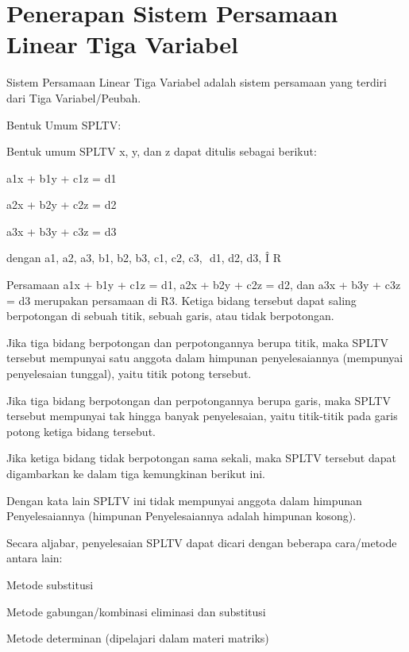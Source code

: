 \documentclass[11pt,fleqn]{book} %
\begin{document}
\section{Penerapan Sistem Persamaan Linear Tiga Variabel}
\sloppy
Sistem Persamaan Linear Tiga Variabel adalah sistem persamaan yang terdiri dari Tiga Variabel/Peubah. \par
\noindent 
Bentuk Umum SPLTV: \par
\noindent 
Bentuk umum SPLTV x, y, dan z dapat ditulis sebagai berikut: \par
\noindent 
a1x + b1y + c1z = d1 \par
\noindent 
a2x + b2y + c2z = d2 \par
\noindent 
a3x + b3y + c3z = d3 \par
\noindent 
dengan a1, a2, a3, b1, b2, b3, c1, c2, c3, $  $ $  $d1, d2, d3, $  $Î $  $R \par
\noindent 
Persamaan a1x + b1y + c1z = d1, a2x + b2y + c2z = d2, dan a3x + b3y + c3z = d3 merupakan persamaan di R3. Ketiga bidang tersebut dapat saling berpotongan di sebuah titik, sebuah garis, atau tidak berpotongan. \par
\noindent 
\begin{myEnumerate}
	\item Jika tiga bidang berpotongan dan perpotongannya berupa titik, maka SPLTV tersebut mempunyai satu anggota dalam himpunan penyelesaiannya (mempunyai penyelesaian tunggal), yaitu titik potong tersebut. \par
	\noindent 
	\item  Jika tiga bidang berpotongan dan perpotongannya berupa garis, maka SPLTV tersebut mempunyai tak hingga banyak penyelesaian, yaitu titik-titik pada garis potong ketiga bidang tersebut. \par
	\noindent 
	\item  Jika ketiga bidang tidak berpotongan sama sekali, maka SPLTV tersebut dapat digambarkan ke dalam tiga kemungkinan berikut ini.\end{myEnumerate}
\par
\noindent 
$  $Dengan kata lain SPLTV ini tidak mempunyai anggota dalam himpunan Penyelesaiannya (himpunan Penyelesaiannya adalah himpunan kosong). \par
\vspace{12pt}
\noindent 
Secara aljabar, penyelesaian SPLTV dapat dicari dengan beberapa cara/metode antara lain: \par
\noindent 
\begin{myEnumerate}
	\item Metode substitusi \par
	\noindent 
	\item Metode gabungan/kombinasi eliminasi dan substitusi \par
	\noindent 
	\item Metode determinan (dipelajari dalam materi matriks)\end{myEnumerate}
\end{document}
